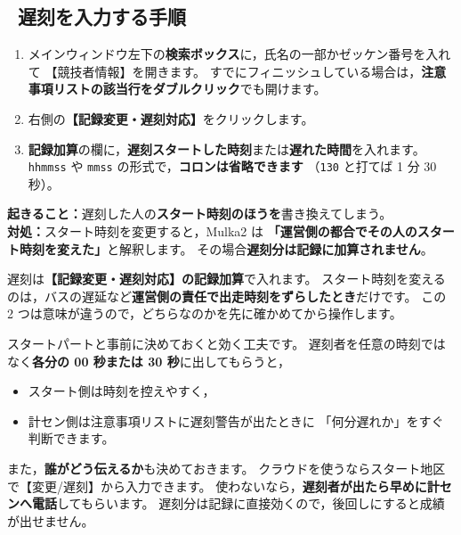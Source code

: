 \subsection*{\tEMIT\ 遅刻を入力する手順}

\begin{enumerate}
\item メインウィンドウ左下の\textbf{検索ボックス}に，氏名の一部かゼッケン番号を入れて
      【競技者情報】を開きます。
      すでにフィニッシュしている場合は，\textbf{注意事項リストの該当行をダブルクリック}でも開けます。
\item 右側の\textbf{【記録変更・遅刻対応】}をクリックします。
\item \textbf{記録加算}の欄に，\textbf{遅刻スタートした時刻}または\textbf{遅れた時間}を入れます。
      \texttt{hhmmss} や \texttt{mmss} の形式で，\textbf{コロンは省略できます}
      （\texttt{130} と打てば 1 分 30 秒）。
\end{enumerate}

\begin{Fail}
\textbf{起きること：}遅刻した人の\textbf{スタート時刻のほうを}書き換えてしまう。\\
\textbf{対処：}スタート時刻を変更すると，Mulka2 は
\textbf{「運営側の都合でその人のスタート時刻を変えた」}と解釈します。
その場合\textbf{遅刻分は記録に加算されません}。

遅刻は\textbf{【記録変更・遅刻対応】の記録加算}で入れます。
スタート時刻を変えるのは，バスの遅延など\textbf{運営側の責任で出走時刻をずらしたとき}だけです。
この 2 つは意味が違うので，どちらなのかを先に確かめてから操作します。
\end{Fail}

\begin{Note}
スタートパートと事前に決めておくと効く工夫です。
遅刻者を任意の時刻ではなく\textbf{各分の 00 秒または 30 秒}に出してもらうと，
\begin{itemize}
\item スタート側は時刻を控えやすく，
\item 計セン側は注意事項リストに遅刻警告が出たときに
      「何分遅れか」をすぐ判断できます。
\end{itemize}
また，\textbf{誰がどう伝えるか}も決めておきます。
クラウドを使うならスタート地区で【変更/遅刻】から入力できます。
使わないなら，\textbf{遅刻者が出たら早めに計センへ電話}してもらいます。
遅刻分は記録に直接効くので，後回しにすると成績が出せません。
\end{Note}


